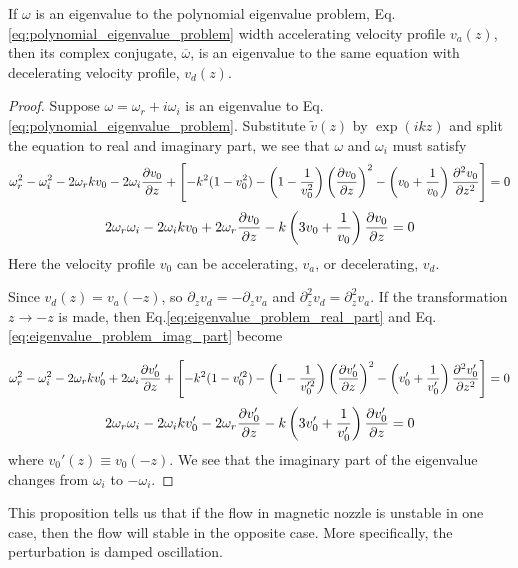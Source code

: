 \begin{proposition} \label{prop:symmetry_of_eigenvalue}
	If $\omega$ is an eigenvalue to the polynomial eigenvalue problem, Eq.\ref{eq:polynomial_eigenvalue_problem} width accelerating velocity profile $v_a(z)$, then its complex conjugate, $\overline{\omega}$, is an eigenvalue to the same equation with decelerating velocity profile, $v_d(z)$.
\end{proposition}
\begin{proof}
	Suppose $\omega=\omega_r + i\omega_i$ is an eigenvalue to Eq.\ref{eq:polynomial_eigenvalue_problem}. Substitute $\tilde{v}(z)$ by $\exp(ikz)$ and split the equation to real and imaginary part, we see that $\omega$ and $\omega_i$ must satisfy
	\begin{equation} \label{eq:eigenvalue_problem_real_part}
		\omega_r^2 - \omega_i^2 
		- 2\omega_r kv_0 - 2\omega_i\pdv{v_0}{z}
		+ \left[
		-k^2(1-v_0^2) 
		-\left(1-\frac{1}{v_0^2}\right)\left(\pdv{v_0}{z}\right)^2
		-\left(v_0+\frac{1}{v_0}\right)\pdv[2]{v_0}{z}
		\right]
		= 0
	\end{equation}
	\begin{equation} \label{eq:eigenvalue_problem_imag_part}
		2\omega_r\omega_i 
		- 2\omega_i kv_0 + 2\omega_r\pdv{v_0}{z} 
		- k\left(3v_0+\frac{1}{v_0}\right)\pdv{v_0}{z} 
		= 0
	\end{equation}
	Here the velocity profile $v_0$ can be accelerating, $v_a$, or decelerating, $v_d$.
	
	Since $v_d(z)=v_a(-z)$, so $\partial_zv_d=-\partial_zv_a$ and $\partial_z^2v_d=\partial_z^2v_a$. If the transformation $z\to -z$ is made, then Eq.\ref{eq:eigenvalue_problem_real_part} and Eq.\ref{eq:eigenvalue_problem_imag_part} become
	
	\[
		\omega_r^2 - \omega_i^2 
		- 2\omega_r kv_0' + 2\omega_i\pdv{v_0'}{z}
		+ \left[
		-k^2(1-v_0'^2) 
		-\left(1-\frac{1}{v_0'^2}\right)\left(\pdv{v_0'}{z}\right)^2
		-\left(v_0'+\frac{1}{v_0'}\right)\pdv[2]{v_0'}{z}
		\right]
		= 0
	\]
	\[
		2\omega_r\omega_i 
		- 2\omega_i kv_0' - 2\omega_r\pdv{v_0'}{z} 
		- k\left(3v_0'+\frac{1}{v_0'}\right)\pdv{v_0'}{z} 
		= 0
	\]
	where $v_0'(z) \equiv v_0(-z)$. We see that the imaginary part of the eigenvalue changes from $\omega_i$ to $-\omega_i$.
\end{proof}

\begin{remark}
	This proposition tells us that if the flow in magnetic nozzle is unstable in one case, then the flow will stable in the opposite case. More specifically, the perturbation is damped oscillation.
\end{remark}


